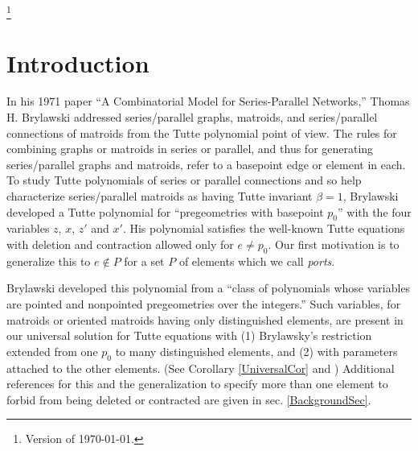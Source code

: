 \documentclass[12pt,leqno]{amsart}
\theoremstyle{remark}
\begin{document}




\thanks{Version of \today.}

\maketitle
\pagestyle{headings}


\section{Introduction}



In his 1971 paper \cite{BrylawskiPointed}
``A Combinatorial Model for Series-Parallel Networks,''
Thomas H. Brylawski
addressed
series/parallel graphs, matroids,
and series/parallel connections of matroids
from the Tutte polynomial point of view.
The rules for 
combining graphs or matroids in series or parallel,
and thus for generating series/parallel graphs and matroids,
refer to
a basepoint edge or element in each.
To study 
Tutte polynomials of series or parallel connections
and so help
characterize
series/parallel matroids as having 
Tutte invariant $\beta=1$,
Brylawski developed
a Tutte polynomial for ``pregeometries with basepoint $p_0$'' 
with the four variables $z$, $x$, $z'$ and $x'$.   
His polynomial satisfies
the well-known Tutte equations with deletion and contraction
allowed only for $e\neq p_0$.  
Our first motivation is to generalize this to $e\not\in P$
for a set $P$ of elements which we call \emph{ports}.


Brylawski developed this
polynomial from
a ``class of polynomials whose variables are pointed and
nonpointed pregeometries over the integers.''
Such variables, for matroids or oriented matroids
having only distinguished elements, are present
in our universal solution for 
Tutte equations with (1) Brylawsky's restriction extended
from one $p_0$ to many distinguished elements, and (2)
with parameters attached to the other elements.
(See Corollary \ref{UniversalCor} and \cite{sdcPorted})
Additional references for this and the generalization
to specify more than one element to forbid from
being deleted or contracted
are given in 
sec. \ref{BackgroundSec}.
\end{document}
